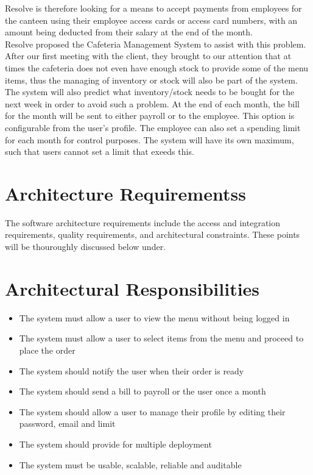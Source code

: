 \documentclass[12pt]{article}
\begin{document}
Resolve is therefore looking for a means to accept payments from employees for the canteen using their employee access cards or access card numbers, with an amount being deducted from their salary at the end of the month.\\

Resolve proposed the Cafeteria Management System to assist with this problem.
After our first meeting with the client, they brought to our attention that at times the cafeteria does not even have enough stock to provide some of the menu items, thus the managing of inventory or stock will also be part of the system. The system will also predict what inventory/stock needs to be bought for the next week in order to avoid such a problem. At the end of each month, the bill for the month will be sent to either payroll or to the employee. This option is configurable from the user's profile. The employee can also set a spending limit for each month for control purposes. The system will have its own maximum, such that users cannot set a limit that exeeds this. 

\section{Architecture Requirementss}
The software architecture requirements include the access and integration requirements, quality
requirements, and architectural constraints. These points will be thouroughly discussed below under.

\section{Architectural Responsibilities}
\begin{itemize}
\item The system must allow a user to view the menu without being logged in
\item The system must allow a user to select items from the menu and proceed to place the order
\item The system should notify the user when their order is ready
\item The system should send a bill to payroll or the user  once a month
\item The system should allow a user to manage their profile by editing their password, email and limit
\item The system should provide for multiple deployment
\item The system must be usable, scalable, reliable and auditable
\end{itemize}
\end{document}

